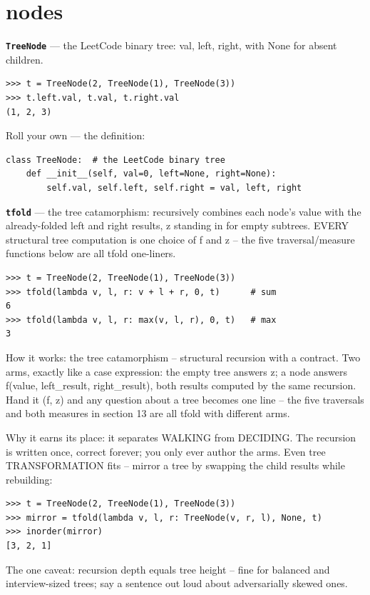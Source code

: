 \documentclass[10pt,letterpaper]{article}
\begin{document}
\section{nodes}
\textbf{\texttt{TreeNode}} --- the LeetCode binary tree: val, left, right, with None for absent children.
\begin{lstlisting}[style=ex]
>>> t = TreeNode(2, TreeNode(1), TreeNode(3))
>>> t.left.val, t.val, t.right.val
(1, 2, 3)
\end{lstlisting}

Roll your own --- the definition:

\begin{lstlisting}[style=ex]
class TreeNode:  # the LeetCode binary tree
    def __init__(self, val=0, left=None, right=None):
        self.val, self.left, self.right = val, left, right
\end{lstlisting}
\textbf{\texttt{tfold}} --- the tree catamorphism: recursively combines each node's value with the already-folded left and right results, z standing in for empty subtrees. EVERY structural tree computation is one choice of f and z -- the five traversal/measure functions below are all tfold one-liners.
\begin{lstlisting}[style=ex]
>>> t = TreeNode(2, TreeNode(1), TreeNode(3))
>>> tfold(lambda v, l, r: v + l + r, 0, t)      # sum
6
>>> tfold(lambda v, l, r: max(v, l, r), 0, t)   # max
3
\end{lstlisting}

How it works: the tree catamorphism -- structural recursion with a contract. Two arms, exactly like a case expression: the empty tree answers z; a node answers f(value, left\_result, right\_result), both results computed by the same recursion. Hand it (f, z) and any question about a tree becomes one line -- the five traversals and both measures in section 13 are all tfold with different arms.


Why it earns its place: it separates WALKING from DECIDING. The recursion is written once, correct forever; you only ever author the arms. Even tree TRANSFORMATION fits -- mirror a tree by swapping the child results while rebuilding:

\begin{lstlisting}[style=ex]
>>> t = TreeNode(2, TreeNode(1), TreeNode(3))
>>> mirror = tfold(lambda v, l, r: TreeNode(v, r, l), None, t)
>>> inorder(mirror)
[3, 2, 1]
\end{lstlisting}

The one caveat: recursion depth equals tree height -- fine for balanced and interview-sized trees; say a sentence out loud about adversarially skewed ones.
\end{document}
